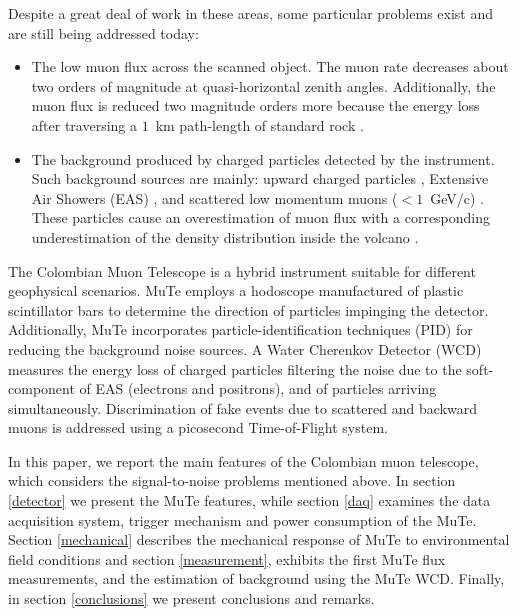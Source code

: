 \documentclass[letterpaper,11pt]{article}
\begin{document}
Despite a great deal of work in these areas, some particular problems exist and are still being addressed today:
\begin{itemize}

\item The low muon flux across the scanned object. The muon rate decreases about two orders of magnitude at quasi-horizontal zenith angles. Additionally, the muon flux is reduced two magnitude orders more because the energy loss after traversing a $1$~km path-length of standard rock \cite{groom2001muon, groom2000passage}. 


\item The background produced by charged particles detected by the instrument. Such background sources are mainly: upward charged particles \cite{jourde2013experimental}, Extensive Air Showers (EAS)  \cite{nishiyama2014experimental, Olah2017ICRC, KUSAGAYA2015, Bene2013, Olh2017}, and scattered low momentum muons ($< 1$~GeV/c) \cite{nishiyama2016monte, Gomez2017, Olh2018, Olah2018Invest, ambrosino2015joint}. These particles cause an overestimation of muon flux with a corresponding underestimation of the density distribution inside the volcano \cite{carbone2013experiment, nishiyama2016monte}.
\end{itemize}

The Colombian Muon Telescope \cite{AsoreyEtal2017B, SierraPortaEtal2018} is a hybrid instrument suitable for different geophysical scenarios. MuTe employs a hodoscope manufactured of plastic scintillator bars to determine the direction of particles impinging the detector. Additionally, MuTe incorporates particle-identification techniques (PID) for reducing the background noise sources\cite{Bonechi2020, pena2019calibration}. A Water Cherenkov Detector (WCD) measures the energy loss of charged particles filtering the noise due to the soft-component of EAS (electrons and positrons), and of particles arriving simultaneously. Discrimination of fake events due to scattered and backward muons is addressed using a picosecond Time-of-Flight system.

In this paper, we report the main features of the Colombian muon telescope, which considers the signal-to-noise problems mentioned above. In section \ref{detector} we present the MuTe features, while section \ref{daq} examines the data acquisition system, trigger mechanism and power consumption of the MuTe. Section \ref{mechanical} describes the mechanical response of MuTe to environmental field conditions and section \ref{measurement}, exhibits the first MuTe flux measurements, and the estimation of background using the MuTe WCD. Finally, in section \ref{conclusions} we present conclusions and remarks.
\end{document}
